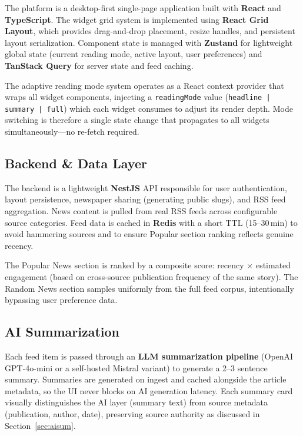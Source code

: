 \documentclass[14pt]{article}
\begin{document}
The platform is a desktop-first single-page application built with \textbf{React} and \textbf{TypeScript}. The widget grid system is implemented using \textbf{React Grid Layout}, which provides drag-and-drop placement, resize handles, and persistent layout serialization. Component state is managed with \textbf{Zustand} for lightweight global state (current reading mode, active layout, user preferences) and \textbf{TanStack Query} for server state and feed caching.

The adaptive reading mode system operates as a React context provider that wraps all widget components, injecting a \texttt{readingMode} value (\texttt{headline | summary | full}) which each widget consumes to adjust its render depth. Mode switching is therefore a single state change that propagates to all widgets simultaneously---no re-fetch required.

\subsection{Backend \& Data Layer}

The backend is a lightweight \textbf{NestJS} API responsible for user authentication, layout persistence, newspaper sharing (generating public slugs), and RSS feed aggregation. News content is pulled from real RSS feeds across configurable source categories. Feed data is cached in \textbf{Redis} with a short TTL (15--30\,min) to avoid hammering sources and to ensure Popular section ranking reflects genuine recency.

The Popular News section is ranked by a composite score: recency $\times$ estimated engagement (based on cross-source publication frequency of the same story). The Random News section samples uniformly from the full feed corpus, intentionally bypassing user preference data.

\subsection{AI Summarization}

Each feed item is passed through an \textbf{LLM summarization pipeline} (OpenAI GPT-4o-mini or a self-hosted Mistral variant) to generate a 2--3 sentence summary. Summaries are generated on ingest and cached alongside the article metadata, so the UI never blocks on AI generation latency. Each summary card visually distinguishes the AI layer (summary text) from source metadata (publication, author, date), preserving source authority as discussed in Section~\ref{sec:aisum}.
\end{document}
